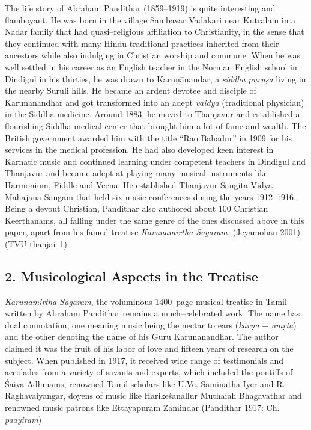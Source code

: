 The life story of Abraham Pandithar (1859–1919) is quite interesting and flamboyant. He was born in the village Sambavar Vadakari near Kutralam in a Nadar family that had quasi–religious affiliation to Christianity, in the sense that they continued with many Hindu traditional practices inherited from their ancestors while also indulging in Christian worship and commune. When he was well settled in his career as an English teacher in the Norman English school in Dindigul in his thirties, he was drawn to Karuṇānandar, a \textit{siddha puruṣa} living in the nearby Suruli hills. He became an ardent devotee and disciple of Karunanandhar and got transformed into an adept \textit{vaidya} (traditional physician) in the Siddha medicine. Around 1883, he moved to Thanjavur and established a flourishing Siddha medical center that brought him a lot of fame and wealth. The British government awarded him with the title “Rao Bahadur” in 1909 for his services in the medical profession. He had also developed keen interest in Karnatic music and continued learning under competent teachers in Dindigul and Thanjavur and became adept at playing many musical instruments like Harmonium, Fiddle and Veena. He established Thanjavur Sangita Vidya Mahajana Sangam that held six music conferences during the years 1912–1916. Being a devout Christian, Pandithar also authored about 100 Christian Keerthanams, all falling under the same genre of the ones discussed above in this paper, apart from his famed treatise \textit{Karunamirtha Sagaram. }(Jeyamohan 2001) (TVU thanjai–1)


\subsection*{2. Musicological Aspects in the Treatise}

\textit{Karunamirtha Sagaram}, the voluminous 1400–page musical treatise in Tamil written by Abraham Pandithar remains a much–celebrated work. The name has dual connotation, one meaning music being the nectar to ears (\textit{karṇa} + \textit{amṛta}) and the other denoting the name of his Guru Karunanandhar. The author claimed it was the fruit of his labor of love and fifteen years of research on the subject. When published in 1917, it received wide range of testimonials and accolades from a variety of savants and experts, which included the pontiffs of Śaiva Adhīnams, renowned Tamil scholars like U.Ve. Saminatha Iyer and R. Raghavaiyangar, doyens of music like Harikeśanallur Muthaiah Bhagavathar and renowned music patrons like Ettayapuram Zamindar (Pandithar 1917: Ch. \textit{paayiram})

